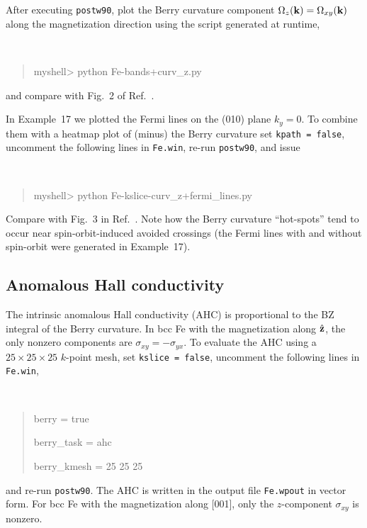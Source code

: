\documentclass[a4paper,11pt,twoside]{article}
\begin{document}
 

After executing {\tt postw90}, plot the Berry curvature component
$\Omega_z({\bf k})=\Omega_{xy}({\bf k})$ along the magnetization
direction using the script generated at runtime, 
%
{\tt
\begin{quote}
myshell> python Fe-bands+curv\_z.py
\end{quote} }

and compare with Fig.~2 of Ref.~\cite{yao-prl04}.  

In Example~17 we plotted the Fermi lines on the (010) plane $k_y=0$.
To combine them with a heatmap plot of (minus) the Berry curvature set
{\tt kpath = false}, uncomment the following lines in {\tt Fe.win},
%
re-run {\tt postw90}, and issue
%
{\tt
\begin{quote}
myshell> python Fe-kslice-curv\_z+fermi\_lines.py
\end{quote} }
\medskip
%
Compare with Fig.~3 in Ref.~\cite{yao-prl04}. Note how the Berry
curvature ``hot-spots'' tend to occur near spin-orbit-induced avoided
crossings (the Fermi lines with and without spin-orbit were generated
in Example~17).

\subsection*{Anomalous Hall conductivity}

The intrinsic anomalous Hall conductivity (AHC) is proportional to the
BZ integral of the Berry curvature. In bcc Fe with the magnetization
along $\hat{\bf z}$, the only nonzero components are
$\sigma_{xy}=-\sigma_{yx}$.  To evaluate the AHC using a $25\times
25\times 25$ $k$-point mesh, set {\tt kslice = false}, uncomment the
following lines in {\tt Fe.win}, {\tt
\begin{quote}
berry = true

berry\_task = ahc                

berry\_kmesh = 25 25 25

\end{quote} } and re-run {\tt postw90}.  The AHC is written in the
output file {\tt Fe.wpout} in vector form.  For bcc Fe with the
magnetization along [001], only the $z$-component $\sigma_{xy}$ is
nonzero.
\end{document}
